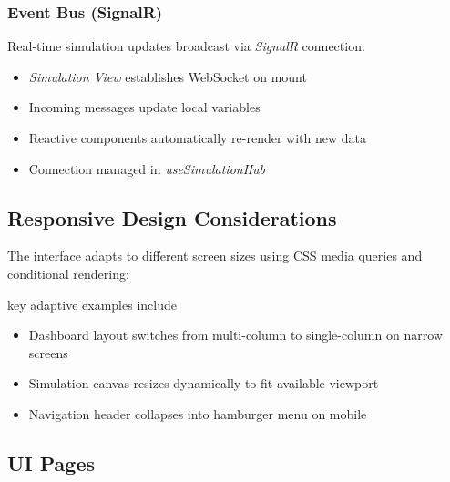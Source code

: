 \subsubsection*{Event Bus (SignalR)}
Real-time simulation updates broadcast via \textit{SignalR} connection:
\begin{itemize}
    \item \textit{Simulation View} establishes WebSocket on mount
    \item Incoming messages update local variables
    \item Reactive components automatically re-render with new data
    \item Connection managed in \textit{useSimulationHub}
\end{itemize}

\subsection{Responsive Design Considerations}

The interface adapts to different screen sizes using CSS media queries and conditional rendering:

key adaptive examples include

\begin{itemize}
    \item Dashboard layout switches from multi-column to single-column on narrow screens
    \item Simulation canvas resizes dynamically to fit available viewport
    \item Navigation header collapses into hamburger menu on mobile
\end{itemize}

\subsection{UI Pages}

